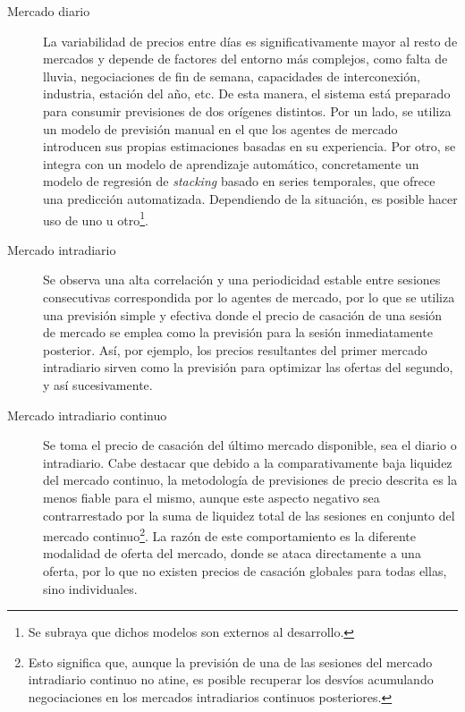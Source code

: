 \begin{description}

  \item[Mercado diario] La variabilidad de precios entre días es significativamente mayor al resto de mercados y depende de factores del entorno más complejos, como falta de lluvia, negociaciones de fin de semana, capacidades de interconexión, industria, estación del año, etc. De esta manera, el sistema está preparado para consumir previsiones de dos orígenes distintos. Por un lado, se utiliza un modelo de previsión manual en el que los agentes de mercado introducen sus propias estimaciones basadas en su experiencia. Por otro, se integra con un modelo de aprendizaje automático, concretamente un modelo de regresión de \textit{stacking} basado en series temporales, que ofrece una predicción automatizada. Dependiendo de la situación, es posible hacer uso de uno u otro\footnote{Se subraya que dichos modelos son externos al desarrollo.}.

  \item[Mercado intradiario] Se observa una alta correlación y una periodicidad estable entre sesiones consecutivas correspondida por lo agentes de mercado, por lo que se utiliza una previsión simple y efectiva donde el precio de casación de una sesión de mercado se emplea como la previsión para la sesión inmediatamente posterior. Así, por ejemplo, los precios resultantes del primer mercado intradiario sirven como la previsión para optimizar las ofertas del segundo, y así sucesivamente.

  \item[Mercado intradiario continuo] Se toma el precio de casación del último mercado disponible, sea el diario o intradiario. Cabe destacar que debido a la comparativamente baja liquidez del mercado continuo, la metodología de previsiones de precio descrita es la menos fiable para el mismo, aunque este aspecto negativo sea contrarrestado por la suma de liquidez total de las sesiones en conjunto del mercado continuo\footnote{Esto significa que, aunque la previsión de una de las sesiones del mercado intradiario continuo no atine, es posible recuperar los desvíos acumulando negociaciones en los mercados intradiarios continuos posteriores.}. La razón de este comportamiento es la diferente modalidad de oferta del mercado, donde se ataca directamente a una oferta, por lo que no existen precios de casación globales para todas ellas, sino individuales.

\end{description}


